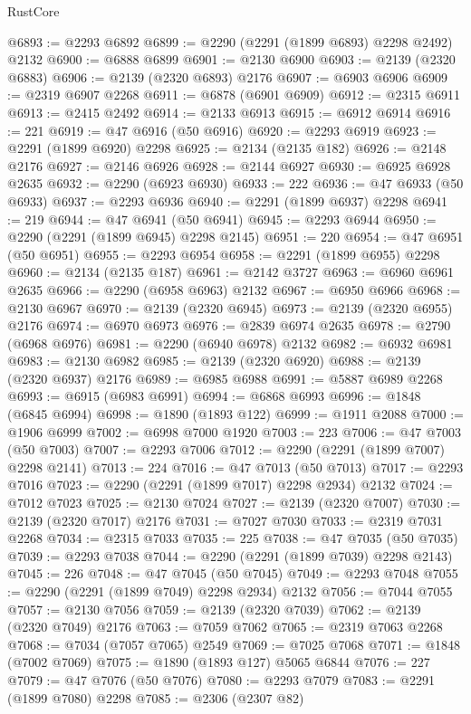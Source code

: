 \begin{lexlean}{RustCore}
\begin{coremodule}
@6893 := @2293 @6892
@6899 := @2290 (@2291 (@1899 @6893) @2298 @2492) @2132
@6900 := @6888 @6899
@6901 := @2130 @6900
@6903 := @2139 (@2320 @6883)
@6906 := @2139 (@2320 @6893) @2176
@6907 := @6903 @6906
@6909 := @2319 @6907 @2268
@6911 := @6878 (@6901 @6909)
@6912 := @2315 @6911
@6913 := @2415 @2492
@6914 := @2133 @6913
@6915 := @6912 @6914
@6916 := 221
@6919 := @47 @6916 (@50 @6916)
@6920 := @2293 @6919
@6923 := @2291 (@1899 @6920) @2298
@6925 := @2134 (@2135 @182)
@6926 := @2148 @2176
@6927 := @2146 @6926
@6928 := @2144 @6927
@6930 := @6925 @6928 @2635
@6932 := @2290 (@6923 @6930)
@6933 := 222
@6936 := @47 @6933 (@50 @6933)
@6937 := @2293 @6936
@6940 := @2291 (@1899 @6937) @2298
@6941 := 219
@6944 := @47 @6941 (@50 @6941)
@6945 := @2293 @6944
@6950 := @2290 (@2291 (@1899 @6945) @2298 @2145)
@6951 := 220
@6954 := @47 @6951 (@50 @6951)
@6955 := @2293 @6954
@6958 := @2291 (@1899 @6955) @2298
@6960 := @2134 (@2135 @187)
@6961 := @2142 @3727
@6963 := @6960 @6961 @2635
@6966 := @2290 (@6958 @6963) @2132
@6967 := @6950 @6966
@6968 := @2130 @6967
@6970 := @2139 (@2320 @6945)
@6973 := @2139 (@2320 @6955) @2176
@6974 := @6970 @6973
@6976 := @2839 @6974 @2635
@6978 := @2790 (@6968 @6976)
@6981 := @2290 (@6940 @6978) @2132
@6982 := @6932 @6981
@6983 := @2130 @6982
@6985 := @2139 (@2320 @6920)
@6988 := @2139 (@2320 @6937) @2176
@6989 := @6985 @6988
@6991 := @5887 @6989 @2268
@6993 := @6915 (@6983 @6991)
@6994 := @6868 @6993
@6996 := @1848 (@6845 @6994)
@6998 := @1890 (@1893 @122)
@6999 := @1911 @2088
@7000 := @1906 @6999
@7002 := @6998 @7000 @1920
@7003 := 223
@7006 := @47 @7003 (@50 @7003)
@7007 := @2293 @7006
@7012 := @2290 (@2291 (@1899 @7007) @2298 @2141)
@7013 := 224
@7016 := @47 @7013 (@50 @7013)
@7017 := @2293 @7016
@7023 := @2290 (@2291 (@1899 @7017) @2298 @2934) @2132
@7024 := @7012 @7023
@7025 := @2130 @7024
@7027 := @2139 (@2320 @7007)
@7030 := @2139 (@2320 @7017) @2176
@7031 := @7027 @7030
@7033 := @2319 @7031 @2268
@7034 := @2315 @7033
@7035 := 225
@7038 := @47 @7035 (@50 @7035)
@7039 := @2293 @7038
@7044 := @2290 (@2291 (@1899 @7039) @2298 @2143)
@7045 := 226
@7048 := @47 @7045 (@50 @7045)
@7049 := @2293 @7048
@7055 := @2290 (@2291 (@1899 @7049) @2298 @2934) @2132
@7056 := @7044 @7055
@7057 := @2130 @7056
@7059 := @2139 (@2320 @7039)
@7062 := @2139 (@2320 @7049) @2176
@7063 := @7059 @7062
@7065 := @2319 @7063 @2268
@7068 := @7034 (@7057 @7065) @2549
@7069 := @7025 @7068
@7071 := @1848 (@7002 @7069)
@7075 := @1890 (@1893 @127) @5065 @6844
@7076 := 227
@7079 := @47 @7076 (@50 @7076)
@7080 := @2293 @7079
@7083 := @2291 (@1899 @7080) @2298
@7085 := @2306 (@2307 @82)

\end{coremodule}
\end{lexlean}
